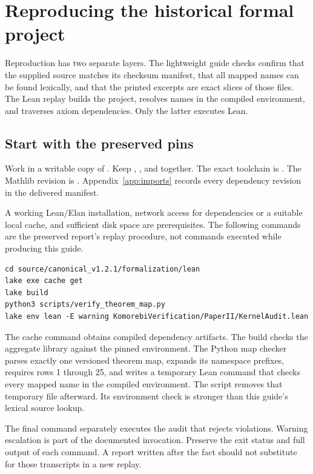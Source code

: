 \section{Reproducing the historical formal project}\label{sec:replay}

Reproduction has two separate layers. The lightweight guide checks confirm that the supplied source matches its checksum manifest, that all mapped names can be found lexically, and that the printed excerpts are exact slices of those files. The Lean replay builds the project, resolves names in the compiled environment, and traverses axiom dependencies. Only the latter executes Lean.

\subsection{Start with the preserved pins}

Work in a writable copy of . Keep , , and  together. The exact toolchain is . The Mathlib revision is . Appendix~\ref{app:imports} records every dependency revision in the delivered manifest.

A working Lean/Elan installation, network access for dependencies or a suitable local cache, and sufficient disk space are prerequisites. The following commands are the preserved report's replay procedure, not commands executed while producing this guide.
\begin{Verbatim}[fontsize=\small,frame=leftline,rulecolor=\color{teal},framesep=6pt,breaklines=true]
cd source/canonical_v1.2.1/formalization/lean
lake exe cache get
lake build
python3 scripts/verify_theorem_map.py
lake env lean -E warning KomorebiVerification/PaperII/KernelAudit.lean
\end{Verbatim}

The cache command obtains compiled dependency artifacts. The build checks the aggregate library against the pinned environment. The Python map checker parses exactly one versioned theorem map, expands its namespace prefixes, requires rows 1 through 25, and writes a temporary Lean command that checks every mapped name in the compiled environment. The script removes that temporary file afterward. Its environment check is stronger than this guide's lexical source lookup.

The final command separately executes the audit that rejects violations. Warning escalation is part of the documented invocation. Preserve the exit status and full output of each command. A report written after the fact should not substitute for those transcripts in a new replay.

